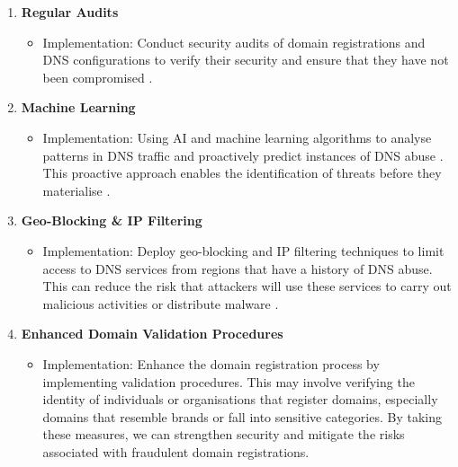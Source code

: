 \begin{enumerate}
\begin{itemize}
    \end{itemize}
    \item \textbf{Regular Audits}
    \begin{itemize}
        \item Implementation: Conduct security audits of domain registrations and DNS configurations to verify their security and ensure that they have not been compromised \cite{coronado2014auditing}.
    \end{itemize}
    \item \textbf{Machine Learning}
    \begin{itemize}
        \item Implementation: Using AI and machine learning algorithms to analyse patterns in DNS traffic and proactively predict instances of DNS abuse \cite{icannndnssec}. This proactive approach enables the identification of threats before they materialise \cite{tsukerman2019machine}.
    \end{itemize}
    \item \textbf{Geo-Blocking \& IP Filtering}
    \begin{itemize}
        \item Implementation: Deploy geo-blocking and IP filtering techniques to limit access to DNS services from regions that have a history of DNS abuse. This can reduce the risk that attackers will use these services to carry out malicious activities or distribute malware \cite{meeseedited}.
    \end{itemize}
    \item \textbf{Enhanced Domain Validation Procedures}
    \begin{itemize}
        \item Implementation: Enhance the domain registration process by implementing validation procedures. This may involve verifying the identity of individuals or organisations that register domains, especially domains that resemble brands or fall into sensitive categories. By taking these measures, we can strengthen security and mitigate the risks associated with fraudulent domain registrations.
    \end{itemize}
\end{enumerate}


